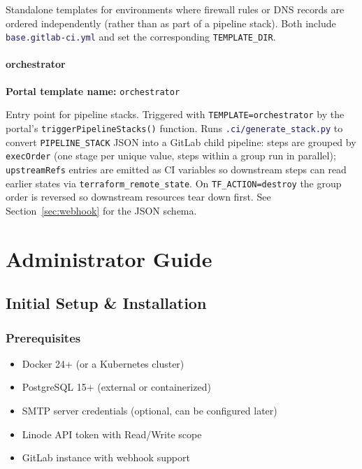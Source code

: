 \documentclass[12pt,a4paper,twoside]{report}
\newcommand{\code}[1]{\texttt{#1}}
\newcommand{\file}[1]{\texttt{\textcolor{MidnightBlue}{#1}}}
\begin{document}
Standalone templates for environments where firewall rules or DNS
records are ordered independently (rather than as part of a pipeline
stack). Both include \file{base.gitlab-ci.yml} and set the
corresponding \code{TEMPLATE\_DIR}.

\subsection{orchestrator}

\textbf{Portal template name:} \code{orchestrator}

Entry point for pipeline stacks. Triggered with
\code{TEMPLATE=orchestrator} by the portal's
\code{triggerPipelineStacks()} function. Runs
\file{.ci/generate\_stack.py} to convert \code{PIPELINE\_STACK} JSON
into a GitLab child pipeline: steps are grouped by \code{execOrder}
(one stage per unique value, steps within a group run in parallel);
\code{upstreamRefs} entries are emitted as CI variables so
downstream steps can read earlier states via
\code{terraform\_remote\_state}. On \code{TF\_ACTION=destroy} the
group order is reversed so downstream resources tear down first. See
Section~\ref{sec:webhook} for the JSON schema.

\part{Administrator Guide}
\label{part:admin}

\chapter{Initial Setup \& Installation}
\label{ch:setup}

\section{Prerequisites}

\begin{itemize}
  \item Docker 24+ (or a Kubernetes cluster)
  \item PostgreSQL 15+ (external or containerized)
  \item SMTP server credentials (optional, can be configured later)
  \item Linode API token with Read/Write scope
  \item GitLab instance with webhook support
\end{itemize}
\end{document}
